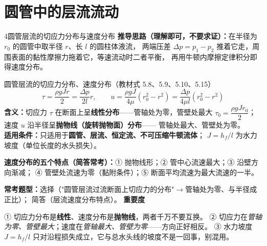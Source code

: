 \section{圆管中的层流流动}

\begin{kaodian}{4}{圆管层流的切应力分布与速度分布}
\textbf{推导思路（理解即可，不要求证）：}在半径为 $r_0$ 的圆管中取半径 $r$、长 $l$ 的圆柱体液流，
两端压差 $\Delta p=p_1-p_2$ 推着它走，周围表面的黏性摩擦力拖着它，等速流动时二者平衡，
再用牛顿内摩擦定律积分即得速度分布。

\begin{gongshi}{圆管层流的切应力分布、速度分布（教材式 5.8、5.9、5.10、5.15）}
\[ \tau=\frac{\rho g J r}{2}=\frac{\Delta p}{2l}r,\qquad
   u=\frac{\rho g J}{4\mu}\left(r_0^2-r^2\right)=\frac{\Delta p}{4\mu l}\left(r_0^2-r^2\right) \]
\textbf{含义：}切应力 $\tau$ 在断面上呈\textbf{线性分布}——管轴处为零，管壁处最大
$\tau_0=\dfrac{\rho g J r_0}{2}$；速度 $u$ 沿半径呈\textbf{抛物线（旋转抛物面）分布}——
管轴处最大、管壁处为零。\\
\textbf{适用条件：}只适用于\textbf{圆管、层流、恒定流、不可压缩牛顿流体}；
$J=h_f/l$ 为水力坡度（单位长度的水头损失）。
\end{gongshi}

\textbf{速度分布的五个特点（简答常考）：}① 抛物线形；② 管中心流速最大；③ 沿壁方向渐减；
④ 管壁处流速为零（黏附条件）；⑤ 断面平均流速为最大流速的一半。

\textbf{常考题型：}选择（"圆管层流过流断面上切应力的分布"$\to$管轴处为零、与半径成正比）；
简答（层流速度分布特点）。
\textbf{重要度 }\quad{}\quad{}

\begin{yicuo}
① 切应力分布是\textbf{线性}、速度分布是\textbf{抛物线}，两者千万不要互换。
② 切应力在\emph{管轴为零、管壁最大}；速度在\emph{管轴最大、管壁为零}——方向正好相反。
③ 水力坡度 $J=h_f/l$ 只对沿程损失成立，它与总水头线的坡度不是一回事，别混用。
\end{yicuo}
\end{kaodian}

